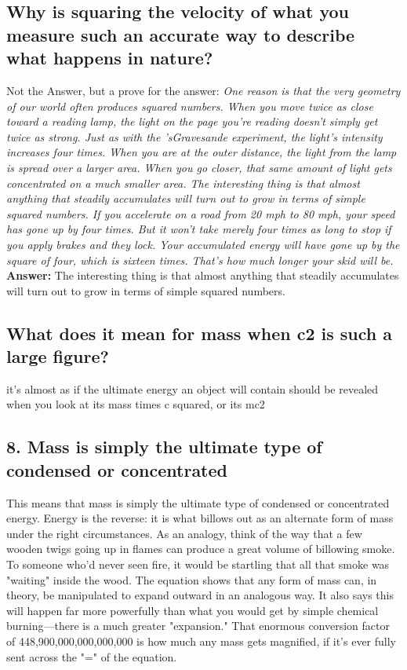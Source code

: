 \subsection*{Why is squaring the velocity of what you measure such an accurate way to describe what happens in nature?}
Not the Answer, but a prove for the answer: \emph{One reason is that the very geometry of our world often produces squared numbers. When you move twice as close toward a reading lamp, the light on the page you're reading doesn't simply get twice as strong. Just as with the 'sGravesande experiment, the light's intensity increases four times. When you are at the outer distance, the light from the lamp is spread over a larger area. When you go closer, that same amount of light gets concentrated on a much smaller area. The interesting thing is that almost anything that steadily accumulates will turn out to grow in terms of simple squared numbers. If you accelerate on a road from 20 mph to 80 mph, your speed has gone up by four times. But it won't take merely four times as long to stop if you apply brakes and they lock. Your accumulated energy will have gone up by the square of four, which is sixteen times. That's how much longer your skid will be.}\\
\textbf{Answer:} The interesting thing is that almost anything that steadily accumulates will turn out to grow in terms of simple squared numbers.

\subsection*{What does it mean for mass when c2 is such a large figure?}
it's almost as if the ultimate energy an object will contain should be revealed when you look at its mass times c squared, or its mc2

\subsection*{8. Mass is simply the ultimate type of condensed or concentrated}
This means that mass is simply the ultimate type of condensed or concentrated energy. Energy is the reverse: it is what billows out as an alternate form of mass under the right circumstances. As an analogy, think of the way that a few wooden twigs going up in flames can produce a great volume of billowing smoke. To someone who'd never seen fire, it would be startling that all that smoke was "waiting" inside the wood. The equation shows that any form of mass can, in theory, be manipulated to expand outward in an analogous way. It also says this will happen far more powerfully than what you would get by simple chemical burning—there is a much greater "expansion." That enormous conversion factor of 448,900,000,000,000,000 is how much any mass gets magnified, if it's ever fully sent across the "=" of the equation.
